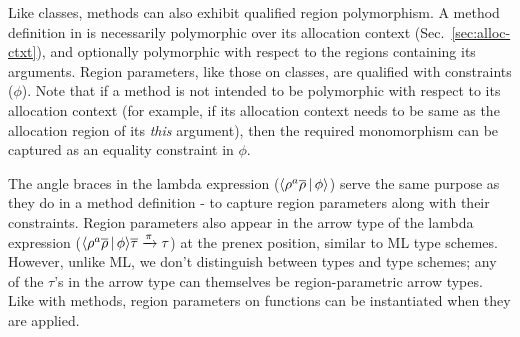 
Like classes, methods can also exhibit qualified region polymorphism.
A method definition in \FB is necessarily polymorphic over its
allocation context (Sec.~\ref{sec:alloc-ctxt}), and optionally
polymorphic with respect to the regions containing its arguments.
Region parameters, like those on classes, are qualified with
constraints ($\phi$).
Note that if a method is not intended to be polymorphic with respect
to its allocation context (for example, if its allocation context
needs to be same as the allocation region of its \emph{this}
argument), then the required monomorphism can be captured as an
equality constraint in $\phi$.  

The angle braces in the lambda expression ($\langle \rho^a\overline{\rho} \,|\,
\phi \rangle$) serve the same purpose as they do in a method definition - to
capture region parameters along with their constraints. Region
parameters also appear in the arrow type of the lambda expression 
($\langle \rho^a\overline{\rho} \,|\, \phi \rangle\overline{\tau} \xrightarrow{\pi}
\tau$) at the prenex position, similar to ML type schemes. However,
unlike ML, we don't distinguish between types and type schemes; any of
the $\tau$'s in the arrow type can themselves be region-parametric
arrow types. Like with methods, region parameters on functions can be
instantiated when they are applied.

